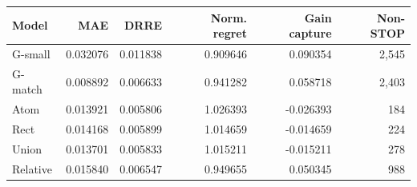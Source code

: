 \begin{center}
\begin{minipage}{\linewidth}
\centering\small
\setlength{\tabcolsep}{3pt}
\label{tab:coco-decision}
\begin{tabular}{lrrrrr}
\toprule
Model & MAE & DRRE & Norm. regret & Gain capture & Non-STOP \\
\midrule
G-small & 0.032076 & 0.011838 & 0.909646 & 0.090354 & 2,545 \\
G-match & 0.008892 & 0.006633 & 0.941282 & 0.058718 & 2,403 \\
Atom & 0.013921 & 0.005806 & 1.026393 & -0.026393 & 184 \\
Rect & 0.014168 & 0.005899 & 1.014659 & -0.014659 & 224 \\
Union & 0.013701 & 0.005833 & 1.015211 & -0.015211 & 278 \\
Relative & 0.015840 & 0.006547 & 0.949655 & 0.050345 & 988 \\
\bottomrule
\end{tabular}
\end{minipage}
\end{center}
